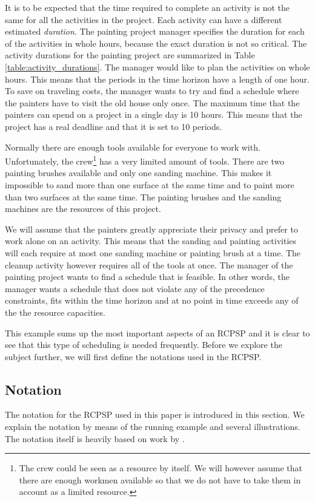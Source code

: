 \documentclass{article}
\theoremstyle{definition}
\begin{document}
It is to be expected that the time required to complete an activity is not the same for all the activities in the project. 
Each activity can have a different estimated \emph{duration}.
The painting project manager specifies the duration for each of the activities in whole hours, because the exact duration is not so critical. 
The activity durations for the painting project are summarized in Table \ref{table:activity_durations}. 
The manager would like to plan the activities on whole hours. 
This means that the periods in the time horizon have a length of one hour. 
To save on traveling costs, the manager wants to try and find a schedule where the painters have to visit the old house only once. 
The maximum time that the painters can spend on a project in a single day is 10 hours. 
This means that the project has a real deadline and that it is set to 10 periods. 

Normally there are enough tools available for everyone to work with.
Unfortunately, the crew\footnote{The crew could be seen as a resource by itself. We will however assume that there are enough workmen available so that we do not have to take them in account as a limited resource. } has a very limited amount of tools.
There are two painting brushes available and only one sanding machine. 
This makes it impossible to sand more than one surface at the same time and to paint more than two surfaces at the same time.
The painting brushes and the sanding machines are the resources of this project. 

We will assume that the painters greatly appreciate their privacy and prefer to work alone on an activity. This means that the sanding and painting activities will each require at most one sanding machine or painting brush at a time. 
The cleanup activity however requires all of the tools at once. 
The manager of the painting project wants to find a schedule that is feasible. 
In other words, the manager wants a schedule that does not violate any of the precedence constraints, fits within the time horizon and at no point in time exceeds any of the the resource capacities.

This example sums up the most important aspects of an RCPSP and it is clear to see that this type of scheduling is needed frequently.
Before we explore the subject further, we will first define the notations used in the RCPSP.

\subsection{Notation}
\label{text:RCPSP_notation}
The notation for the RCPSP used in this paper is introduced in this section. We explain the notation by means of the running example and several illustrations. The notation itself is heavily based on work by \citet{brucker99}. 
\end{document}
